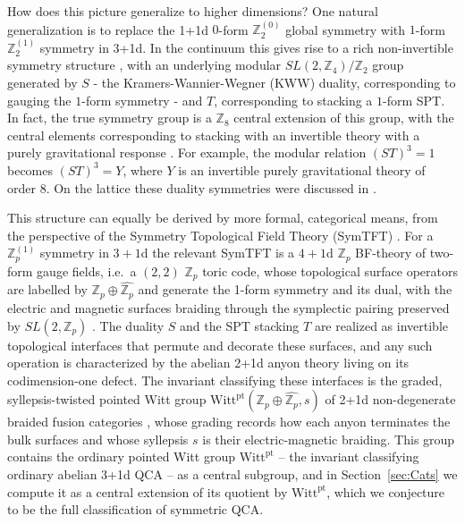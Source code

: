 \documentclass[aps,twocolumn,prx,floatfix,preprintnumbers, nofootinbib,10pt]{revtex4-2}
\numberwithin{equation}{section}
\theoremstyle{definition}
\theoremstyle{remark}
\theoremstyle{claim}
\newcommand{\Z}{{\mathbb Z}}
\newcommand{\Witt}{\text{Witt}}
\newcommand{\pt}{\text{pt}}
\begin{document}
How does this picture generalize to higher dimensions?  One natural generalization is to replace the 1+1d $0$-form $\Z_2^{(0)}$ global symmetry with $1$-form $\Z_2^{(1)}$ symmetry in 3+1d.  In the continuum this gives rise to a rich non-invertible symmetry structure \cite{Kaidi:2021xfk, Choi:2021kmx, Bhardwaj:2022yxj, Choi:2022zal}, with an underlying modular $SL(2,\Z_4) / \Z_2$ \cite{BhardwajLeeTachikawa2020} group generated by $S$ - the Kramers-Wannier-Wegner (KWW) duality, corresponding to gauging the $1$-form symmetry - and $T$, corresponding to stacking a $1$-form SPT. In fact, the true symmetry group is a $\Z_8$ central extension of this group, with the central elements corresponding to stacking with an invertible theory with a purely gravitational response \cite{Witten2005SL2Z, BhardwajLeeTachikawa2020}.  For example, the modular relation $(ST)^3=1$ becomes $(ST)^3 = Y$, where $Y$ is an invertible purely gravitational theory of order $8$.  
On the lattice these duality symmetries were discussed in \cite{Gorantla:2024ocs, Koide:2021zxj}.

This structure can equally be derived by more formal, categorical means, from
the perspective of the Symmetry Topological Field Theory (SymTFT)
\cite{Ji:2019jhk, Apruzzi:2021nmk, Kaidi:2022cpf, Antinucci:2022vyk}. For a
$\Z_p^{(1)}$ symmetry in $3+1$d the relevant SymTFT is a $4+1$d $\Z_p$ BF-theory of two-form gauge fields, i.e.\ a $(2,2)$ $\Z_p$ toric code, whose topological
surface operators are labelled by $\Z_p\oplus\widehat{\Z_p}$ and generate the 1-form symmetry and its dual, with the electric and magnetic surfaces braiding
through the symplectic pairing preserved by $SL(2,\Z_p)$ 
\cite{Bhardwaj:2024xcx}. 
The duality $S$ and the SPT stacking $T$ are realized as
invertible topological interfaces that permute and decorate these surfaces, and any such operation is characterized by
the abelian 2+1d anyon theory living on its codimension-one defect. The invariant classifying these interfaces is the graded, syllepsis-twisted pointed Witt group $\Witt^\pt(\Z_p\oplus\widehat{\Z_p},s)$ of 2+1d non-degenerate
braided fusion categories \cite{Bhardwaj:2024xcx}, whose grading records how each anyon terminates the bulk surfaces and whose syllepsis $s$ is their electric-magnetic braiding. This group contains the ordinary pointed Witt group $\Witt^\pt$ -- the invariant classifying ordinary abelian 3+1d QCA
\cite{Shirley_2022, HaahFidkowskiHastings2023} -- as a central subgroup, and in
Section~\ref{sec:Cats} we compute it as a central extension of its quotient by
$\Witt^\pt$, which we conjecture to be the full classification of symmetric QCA.
\end{document}
